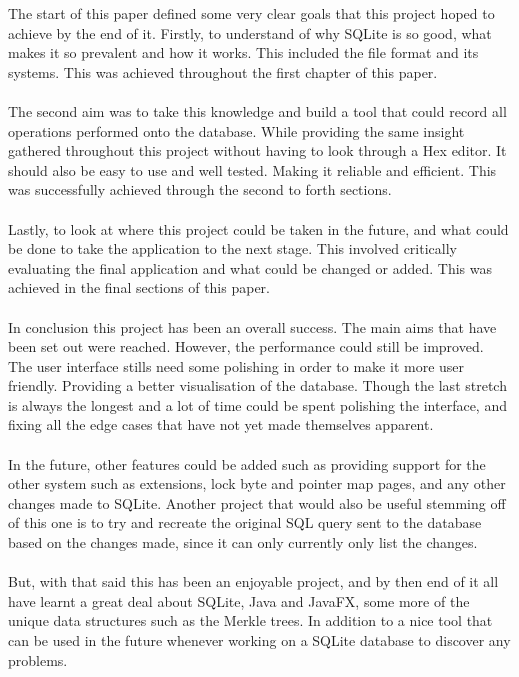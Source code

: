 The start of this paper defined some very clear goals that this project hoped to achieve by the end of it. Firstly, to understand of why SQLite is so good, what makes it so prevalent and how it works. This included the file format and its systems. This was achieved throughout the first chapter of this paper. 
\\\\
The second aim was to take this knowledge and build a tool that could record all operations performed onto the database. While providing the same insight gathered throughout this project without having to look through a Hex editor. It should also be easy to use and well tested. Making it reliable and efficient. This was successfully achieved through the second to forth sections.
\\\\
Lastly, to look at where this project could be taken in the future, and what could be done to take the application to the next stage. This involved critically evaluating the final application and what could be changed or added. This was achieved in the final sections of this paper.
\\\\
In conclusion this project has been an overall success. The main aims that have been set out were reached. However, the performance could still be improved. The user interface stills need some polishing in order to make it more user friendly. Providing a better visualisation of the database. Though the last stretch is always the longest and a lot of time could be spent polishing the interface, and fixing all the edge cases that have not yet made themselves apparent.
\\\\
In the future, other features could be added such as providing support for the other system such as  extensions, lock byte and pointer map pages, and any other changes made to SQLite. Another project that would also be useful stemming off of this one is to try and recreate the original SQL query sent to the database based on the changes made, since it can only currently only list the changes. 
\\\\
But, with that said this has been an enjoyable project, and by then end of it all have learnt a great deal about SQLite, Java and JavaFX, some more of the unique data structures such as the Merkle trees. In addition to a nice tool that can be used in the future whenever working on a SQLite database to discover any problems.
